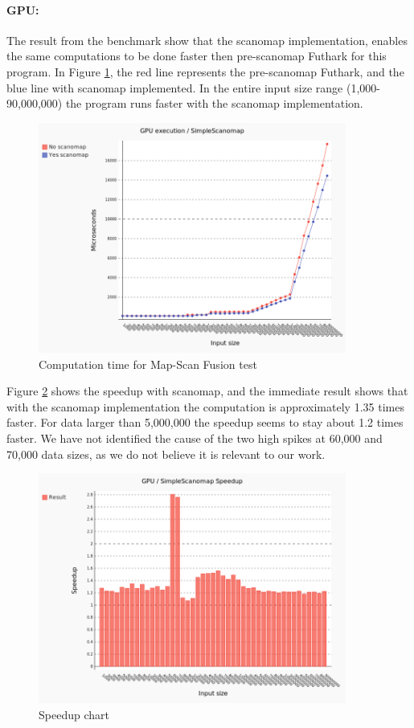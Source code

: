 \documentclass[11pt,bibliography=totocnumbered]{article}
\begin{document}
\paragraph*{GPU:} The result from the benchmark show that the scanomap implementation, enables the same computations to be done faster then pre-scanomap Futhark for this program. In Figure \ref{fig:map-scan fusion test}, the red line represents the pre-scanomap Futhark, and the blue line with scanomap implemented. In the entire input size range (1,000-90,000,000) the program runs faster with the scanomap implementation.

\begin{figure}[h!]
  \centering
    \includegraphics[width=0.9\textwidth]{images/chart.png}
  \caption{Computation time for Map-Scan Fusion test}
  \label{fig:map-scan fusion test}
\end{figure}

Figure \ref{fig:map-scan fusion speedup} shows the speedup with scanomap, and the immediate result shows that with the scanomap implementation the computation is approximately 1.35 times faster. For data larger than 5,000,000 the speedup seems to stay about 1.2 times faster. We have not identified the cause of the two high spikes at 60,000 and 70,000 data sizes, as we do not believe it is relevant to our work.

\begin{figure}[h!]
  \centering
    \includegraphics[width=0.9\textwidth]{images/comparing.png}
  \caption{Speedup chart}
  \label{fig:map-scan fusion speedup}
\end{figure}
\end{document}
